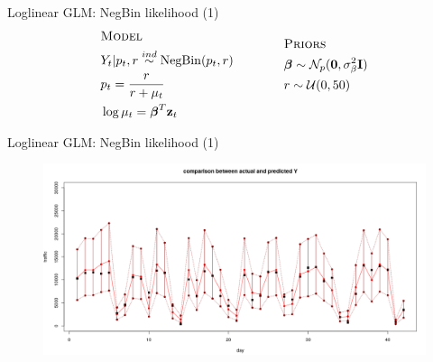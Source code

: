 \documentclass{beamer}
\begin{document}
\begin{frame}{Loglinear GLM: NegBin likelihood (1)}
\begin{equation*}
\begin{aligned}
&\textsc{Model}\\
&Y_t | p_t,r \overset{ind}{\sim} \mathrm{NegBin}(p_t,r)\\
&p_t = \frac{r}{r+\mu_t}\\
&\log{\mu_t} = \boldsymbol{\beta}^T\mathbf{z}_t\\
\end{aligned}
\qquad \qquad
\begin{aligned}[c]
&\textsc{Priors}\\
&\boldsymbol{\beta} \sim \mathcal{N}_p(\mathbf{0}, \sigma^2_\beta\mathbf{I})\\
&r \sim \mathcal{U}(0,50)\\
&\\
\end{aligned}
\end{equation*}
\end{frame}

\begin{frame}{Loglinear GLM: NegBin likelihood (1)}
\begin{figure}[H]
\centering
\includegraphics[width=1\linewidth]{pictures/negbin_single_r_pred.png} 
\end{figure}
\end{frame}
\end{document}
